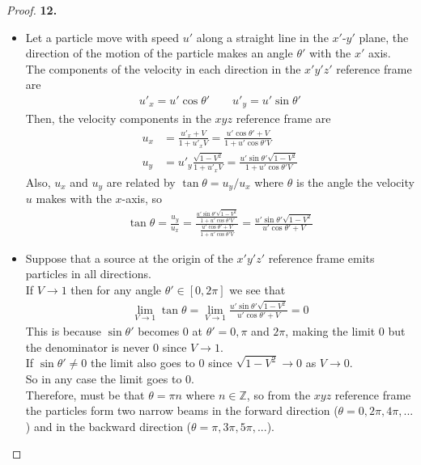 \documentclass[11pt]{article}
\newcommand{\Z}{\mathbb{Z}}
\theoremstyle{definition}
\begin{document}
\cleardoublepage
\begin{proof}{\textbf{12.}}
\begin{itemize}
\item [(a)] Let a particle move with speed $u'$ along a straight line in the
$x'$-$y'$ plane, the direction of the motion of the particle makes an angle
$\theta'$ with the $x'$ axis.\\
The components of the velocity in each direction in the $x'y'z'$ reference
frame are
\begin{align*}
    u'_x = u'\cos\theta' \qquad
    u'_y = u'\sin\theta'
\end{align*}
Then, the velocity components in the $xyz$ reference frame are
\begin{align*}
    u_x &= \frac{u'_x + V}{1 + u'_xV}
    = \frac{u'\cos\theta' + V}{1 + u'\cos\theta' V}\\
    u_y &= u'_y \frac{\sqrt{1 - V^2}}{1 + u'_x V}
    =  \frac{u'\sin\theta'\sqrt{1 - V^2}}{1 + u'\cos\theta' V}
\end{align*}
Also, $u_x$ and $u_y$ are related by $\tan \theta = u_y /u_x$ where $\theta$
is the angle the velocity $u$ makes with the $x$-axis, so
\begin{align*}
    \tan\theta = \frac{u_y}{u_x}
    = \frac{\frac{u'\sin\theta'\sqrt{1 - V^2}}{1 + u'\cos\theta' V}}
    {\frac{u'\cos\theta' + V}{1 + u'\cos\theta' V}}
    =\frac{u'\sin\theta'\sqrt{1 - V^2}}{u'\cos\theta' + V}
\end{align*}

\item [(b)] Suppose that a source at the origin of the $x'y'z'$ reference frame
emits particles in all directions.\\
If $V\to 1$ then for any angle $\theta' \in [0, 2\pi]$ we see that
\begin{align*}
    \lim_{V\to 1} \tan\theta
    = \lim_{V\to 1} \frac{u'\sin\theta'\sqrt{1 - V^2}}{u'\cos\theta' + V}
    = 0
\end{align*}
This is because $\sin\theta'$ becomes 0 at $\theta' = 0, \pi$ and $2\pi$,
making the limit 0 but the denominator is never 0 since $V\to 1$.\\
If $\sin\theta' \neq 0$ the limit also goes to 0 since $\sqrt{1 -V^2} \to 0$
as $V \to 0$.\\
So in any case the limit goes to 0.\\
Therefore, must be that $\theta = \pi n$ where
$n \in \Z$, so from the $xyz$ reference frame the particles form two narrow
beams in the forward direction ($\theta = 0, 2\pi, 4\pi, ...$) and 
in the backward direction ($\theta = \pi, 3\pi, 5\pi, ...$).
\end{itemize}
\end{proof}
\end{document}
